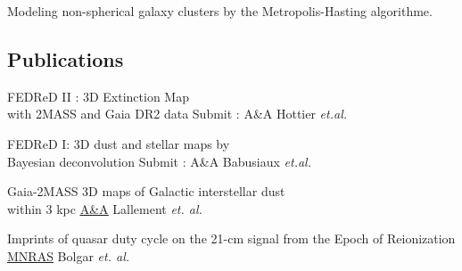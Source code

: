 \documentclass[
 a4paper, 10.5pt,
  sidebarwidth=0.32\paperwidth,
]{fortysecondscv}
\begin{document}
\makefrontsidebar

\begin{cvtable}
  {Modeling non-spherical galaxy clusters by the Metropolis-Hasting algorithme.}
\end{cvtable}


\begin{cvtable}
\end{cvtable}

\subsection{Publications}
\begin{cvtable}
  {FEDReD II : 3D Extinction Map\\ with 2MASS and Gaia DR2 data}
  {Submit : A\&A}
  {Hottier \textit{et.al.}}

  {FEDReD I: 3D dust and stellar maps by \\Bayesian deconvolution}
  {Submit : A\&A}
  {Babusiaux \textit{et.al.}}

  {Gaia-2MASS 3D maps of Galactic interstellar dust\\within 3 kpc}
  {\href{https://ui.adsabs.harvard.edu/\#abs/2019arXiv190204116L/abstract}{\underline{A\&A}}}
  {Lallement \textit{et. al.}}

  {Imprints of quasar duty cycle on the 21-cm signal from the Epoch of Reionization}
  {\href{https://ui.adsabs.harvard.edu/\#abs/2019arXiv190204116L/abstract}{\underline{MNRAS}}}
  {Bolgar \textit{et. al.}}
\end{cvtable}
\end{document}
